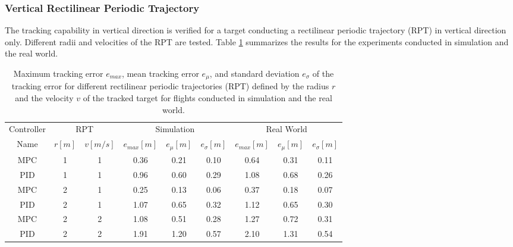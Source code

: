 \subsubsection{Vertical Rectilinear Periodic Trajectory}
The tracking capability in vertical direction is verified for a target conducting a rectilinear periodic trajectory (RPT) in vertical direction only. Different radii and velocities of the RPT are tested. 
Table \ref{tab:rpm_trajectory_evaluation_sim} summarizes the results for the experiments conducted in simulation and the real world.
\begin{table}[]
\center
\small
\caption{Maximum tracking error $e_{max}$, mean tracking error $e_{\mu}$, and standard deviation $e_{\sigma}$ of the tracking error for different rectilinear periodic trajectories (RPT) defined by the radius $r$ and the velocity $v$ of the tracked target for flights conducted in simulation and the real world. \label{tab:rpm_trajectory_evaluation_sim}}
\begin{tabular}{c cc ccc ccc}
\toprule
{Controller} & \multicolumn{2}{c}{RPT} & \multicolumn{3}{c}{Simulation} & \multicolumn{3}{c}{Real World} \\ 
\cmidrule(lr){1-1} \cmidrule(lr){2-3} \cmidrule(lr){4-6} \cmidrule(lr){7-9}
Name & $r [\si{m}]$ & $v [\si{m/s}]$ & $e_{max} [\si{m}]$ & $e_{\mu} [\si{m}]$ & $e_{\sigma} [\si{m}]$ & $e_{max} [\si{m}]$ & $e_{\mu} [\si{m}]$ & $e_{\sigma} [\si{m}]$ \\ 
\midrule 
MPC & 1 & 1 & 0.36 & 0.21 & 0.10 & 0.64 & 0.31 & 0.11 \\ 
PID & 1 & 1 & 0.96 & 0.60 & 0.29 & 1.08 & 0.68 & 0.26 \\ 
\midrule 
MPC & 2 & 1 & 0.25 & 0.13 & 0.06 & 0.37 & 0.18 & 0.07 \\ 
PID & 2 & 1 & 1.07 & 0.65 & 0.32 & 1.12 & 0.65 & 0.30 \\ 
\midrule 
MPC & 2 & 2 & 1.08 & 0.51 & 0.28 & 1.27 & 0.72 & 0.31 \\ 
PID & 2 & 2 & 1.91 & 1.20 & 0.57 & 2.10 & 1.31 & 0.54 \\ 
\bottomrule
\end{tabular} 
\end{table}




